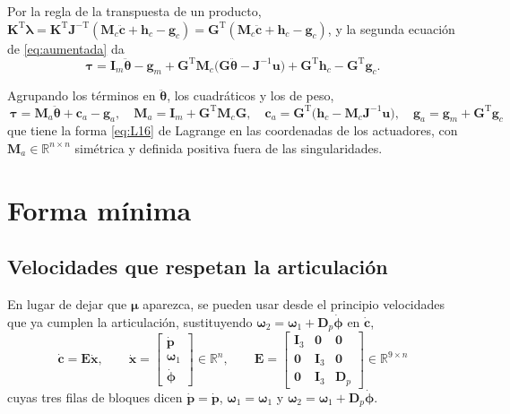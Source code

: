 \documentclass[11pt]{article}
\newcommand{\T}{^{\mathrm{T}}}
\newcommand{\pvec}{\mathbf{p}}
\newcommand{\wv}{\boldsymbol{\omega}}
\newcommand{\lam}{\boldsymbol{\lambda}}
\newcommand{\muv}{\boldsymbol{\mu}}
\newcommand{\cd}{\dot{\mathbf{c}}}
\newcommand{\cdd}{\ddot{\mathbf{c}}}
\newcommand{\xd}{\dot{\mathbf{x}}}
\newcommand{\thv}{\boldsymbol{\theta}}
\newcommand{\tauv}{\boldsymbol{\tau}}
\begin{document}
Por la regla de la transpuesta de un producto, $\mathbf{K}\T\lam=\mathbf{K}\T\mathbf{J}^{-\mathrm{T}}(\mathbf{M}_c\cdd+\mathbf{h}_c-\mathbf{g}_c)=\mathbf{G}\T(\mathbf{M}_c\cdd+\mathbf{h}_c-\mathbf{g}_c)$, y la segunda ecuación de \eqref{eq:aumentada} da
\begin{equation}
\tauv=\mathbf{I}_m\ddot{\thv}-\mathbf{g}_m
+\mathbf{G}\T\mathbf{M}_c\big(\mathbf{G}\ddot{\thv}-\mathbf{J}^{-1}\mathbf{u}\big)
+\mathbf{G}\T\mathbf{h}_c-\mathbf{G}\T\mathbf{g}_c .
\label{eq:fq0}
\end{equation}

Agrupando los términos en $\ddot{\thv}$, los cuadráticos y los de peso,
\begin{equation}
\boxed{\ \tauv=\mathbf{M}_a\ddot{\thv}+\mathbf{c}_a-\mathbf{g}_a,
\quad
\mathbf{M}_a=\mathbf{I}_m+\mathbf{G}\T\mathbf{M}_c\mathbf{G},
\quad
\mathbf{c}_a=\mathbf{G}\T\big(\mathbf{h}_c-\mathbf{M}_c\mathbf{J}^{-1}\mathbf{u}\big),
\quad
\mathbf{g}_a=\mathbf{g}_m+\mathbf{G}\T\mathbf{g}_c\ }
\label{eq:fq}
\end{equation}
que tiene la forma \eqref{eq:L16} de Lagrange en las coordenadas de los actuadores, con $\mathbf{M}_a\in\mathbb{R}^{n\times n}$ simétrica y definida positiva fuera de las singularidades.

\section{Forma mínima}

\subsection{Velocidades que respetan la articulación}

En lugar de dejar que $\muv$ aparezca, se pueden usar desde el principio velocidades que ya cumplen la articulación, sustituyendo $\wv_2=\wv_1+\mathbf{D}_p\dot{\boldsymbol{\phi}}$ en $\cd$,
\begin{equation}
\boxed{\ \cd=\mathbf{E}\xd,
\qquad
\xd=\begin{bmatrix}\dot{\pvec}\\ \wv_1\\ \dot{\boldsymbol{\phi}}\end{bmatrix}\in\mathbb{R}^{n},
\qquad
\mathbf{E}=
\begin{bmatrix}
\mathbf{I}_3 & \mathbf{0} & \mathbf{0}\\
\mathbf{0} & \mathbf{I}_3 & \mathbf{0}\\
\mathbf{0} & \mathbf{I}_3 & \mathbf{D}_p
\end{bmatrix}\in\mathbb{R}^{9\times n}\ }
\label{eq:E}
\end{equation}
cuyas tres filas de bloques dicen $\dot{\pvec}=\dot{\pvec}$, $\wv_1=\wv_1$ y $\wv_2=\wv_1+\mathbf{D}_p\dot{\boldsymbol{\phi}}$.
\end{document}

